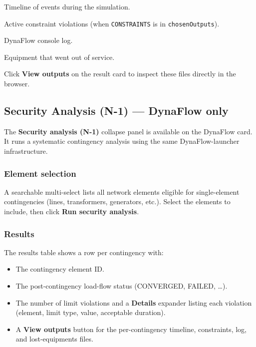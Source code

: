 \documentclass[a4paper,11pt]{article}
\newcommand{\code}[1]{\texttt{\small #1}}
\begin{document}
\begin{description}[leftmargin=2em]
  \item[\code{*\_timeline.xml}] Timeline of events during the simulation.
  \item[\code{*\_constraints.xml}] Active constraint violations (when
    \code{CONSTRAINTS} is in \code{chosenOutputs}).
  \item[\code{*\_dynawo.log}] DynaFlow console log.
  \item[\code{*\_lostEquipments.xml}] Equipment that went out of service.
\end{description}

Click \textbf{View outputs} on the result card to inspect these files directly
in the browser.

\subsection{Security Analysis (N-1) --- DynaFlow only}
\label{sec:securityanalysis}

The \textbf{Security analysis (N-1)} collapse panel is available on the DynaFlow
card. It runs a systematic contingency analysis using the same DynaFlow-launcher
infrastructure.

\subsubsection{Element selection}

A searchable multi-select lists all network elements eligible for single-element
contingencies (lines, transformers, generators, etc.). Select the elements to
include, then click \textbf{Run security analysis}.

\subsubsection{Results}

The results table shows a row per contingency with:

\begin{itemize}[leftmargin=2em]
  \item The contingency element ID.
  \item The post-contingency load-flow status (CONVERGED, FAILED, \ldots).
  \item The number of limit violations and a \textbf{Details} expander listing
    each violation (element, limit type, value, acceptable duration).
  \item A \textbf{View outputs} button for the per-contingency timeline,
    constraints, log, and lost-equipments files.
\end{itemize}
\end{document}
